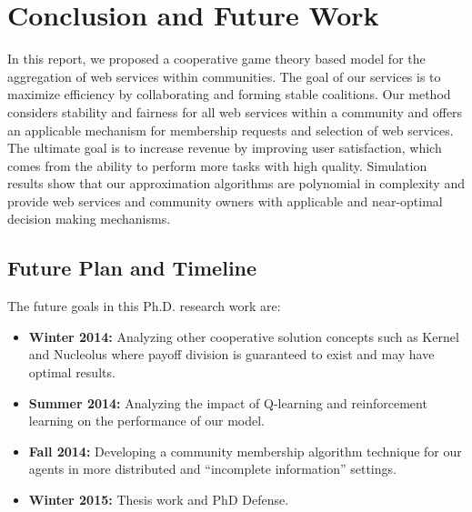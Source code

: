 \setcounter{chapter}{3}
\chapter{Conclusion and Future Work}\label{sec:conclusionfuturework}

In this report, we proposed a cooperative game theory based model for the aggregation of web services within communities.
The goal of our services is to maximize efficiency by collaborating and forming stable
coalitions. Our method considers stability and fairness for all
web services within a community and offers an applicable mechanism
for membership requests and selection of web services. The
ultimate goal is to increase revenue by improving user
satisfaction, which comes from the ability to perform more tasks
with high quality. Simulation results show that our approximation
algorithms are polynomial in complexity and provide web services
and community owners with applicable and near-optimal decision
making mechanisms.


\section {Future Plan and Timeline}

\indent The future goals in this Ph.D. research work are:

\begin{itemize}
\item \textbf{Winter 2014: }Analyzing other cooperative solution concepts such as Kernel
and Nucleolus where payoff division is guaranteed to exist and may
have optimal results.

\item \textbf{Summer 2014: }Analyzing the impact of Q-learning and reinforcement
learning on the performance of our model.

\item \textbf{Fall 2014: }Developing a community membership algorithm technique for
our agents in more distributed and ``incomplete information'' settings.

\item \textbf{Winter 2015: }Thesis work and PhD Defense.
\end{itemize}


